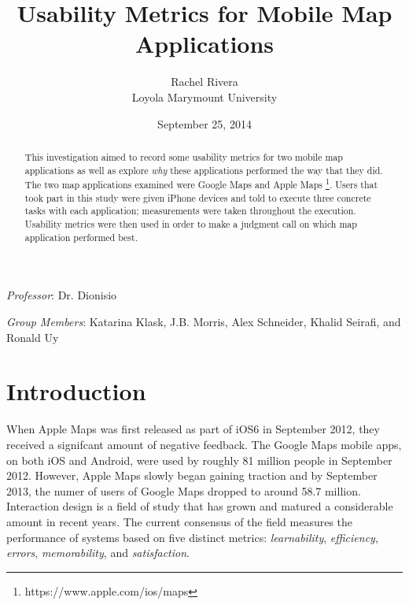 \documentclass[11pt]{article}
\begin{document}
\title{Usability Metrics for Mobile Map Applications}

\author{Rachel Rivera\\
  Loyola Marymount University}

\date{September 25, 2014}


\renewcommand{\thefootnote}{\fnsymbol{footnote}}


\maketitle

\vspace{-.2in}
\begin{abstract}
\noindent This investigation aimed to record some usability metrics for two mobile map applications as well as explore \textit{why} these applications performed the way that they did. The two map applications examined were Google Maps \cite{Pan} and Apple Maps \footnote[2]{https://www.apple.com/ios/maps}. Users that took part in this study were given iPhone devices and told to execute three concrete tasks with each application; measurements were taken throughout the execution. Usability metrics were then used in order to make a judgment call on which map application performed best.
\end{abstract}

\medskip
\medskip

\noindent \textit{Professor}: Dr. Dionisio

\medskip
\noindent \textit{Group Members}: Katarina Klask, J.B. Morris, Alex Schneider, Khalid Seirafi, and Ronald Uy

\thispagestyle{empty}

\clearpage

\setcounter{footnote}{0}
\renewcommand{\thefootnote}{\arabic{footnote}}
\setcounter{page}{1}

\section{Introduction}

When Apple Maps was first released as part of iOS6 in September 2012, they received a signifcant amount of negative feedback. The Google Maps mobile apps, on both iOS and Android, were used by roughly 81 million people in September 2012. However, Apple Maps slowly began gaining traction and by September 2013, the numer of users of Google Maps dropped to around 58.7 million. Interaction design is a field of study that has grown and matured a considerable amount in recent years. The current consensus of the field measures the performance of systems based on five distinct metrics: \textit{learnability}, \textit{efficiency}, \textit{errors}, \textit{memorability}, and \textit{satisfaction}.\cite{Nielsen}
\end{document}
